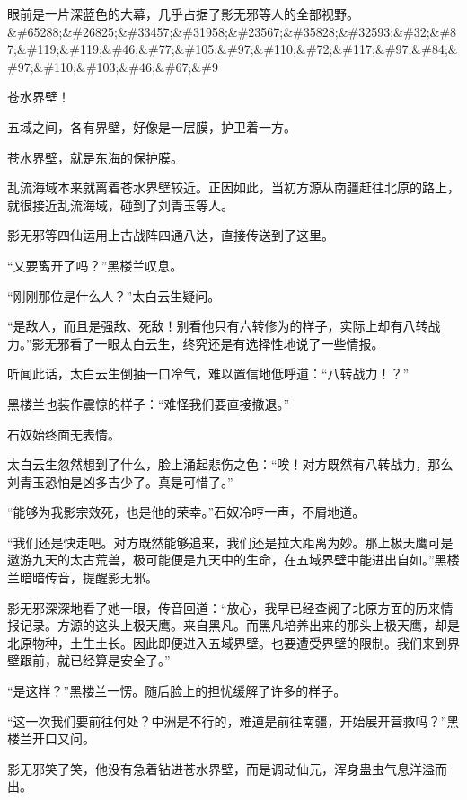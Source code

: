 
\begin{this_body}

眼前是一片深蓝色的大幕，几乎占据了影无邪等人的全部视野。\&\#65288;\&\#26825;\&\#33457;\&\#31958;\&\#23567;\&\#35828;\&\#32593;\&\#32;\&\#87;\&\#119;\&\#119;\&\#46;\&\#77;\&\#105;\&\#97;\&\#110;\&\#72;\&\#117;\&\#97;\&\#84;\&\#97;\&\#110;\&\#103;\&\#46;\&\#67;\&\#9

苍水界壁！

五域之间，各有界壁，好像是一层膜，护卫着一方。

苍水界壁，就是东海的保护膜。

乱流海域本来就离着苍水界壁较近。正因如此，当初方源从南疆赶往北原的路上，就很接近乱流海域，碰到了刘青玉等人。

影无邪等四仙运用上古战阵四通八达，直接传送到了这里。

“又要离开了吗？”黑楼兰叹息。

“刚刚那位是什么人？”太白云生疑问。

“是敌人，而且是强敌、死敌！别看他只有六转修为的样子，实际上却有八转战力。”影无邪看了一眼太白云生，终究还是有选择性地说了一些情报。

听闻此话，太白云生倒抽一口冷气，难以置信地低呼道：“八转战力！？”

黑楼兰也装作震惊的样子：“难怪我们要直接撤退。”

石奴始终面无表情。

太白云生忽然想到了什么，脸上涌起悲伤之色：“唉！对方既然有八转战力，那么刘青玉恐怕是凶多吉少了。真是可惜了。”

“能够为我影宗效死，也是他的荣幸。”石奴冷哼一声，不屑地道。

“我们还是快走吧。对方既然能够追来，我们还是拉大距离为妙。那上极天鹰可是遨游九天的太古荒兽，极可能便是九天中的生命，在五域界壁中能进出自如。”黑楼兰暗暗传音，提醒影无邪。

影无邪深深地看了她一眼，传音回道：“放心，我早已经查阅了北原方面的历来情报记录。方源的这头上极天鹰。来自黑凡。而黑凡培养出来的那头上极天鹰，却是北原物种，土生土长。因此即便进入五域界壁。也要遭受界壁的限制。我们来到界壁跟前，就已经算是安全了。”

“是这样？”黑楼兰一愣。随后脸上的担忧缓解了许多的样子。

“这一次我们要前往何处？中洲是不行的，难道是前往南疆，开始展开营救吗？”黑楼兰开口又问。

影无邪笑了笑，他没有急着钻进苍水界壁，而是调动仙元，浑身蛊虫气息洋溢而出。


\end{this_body}
